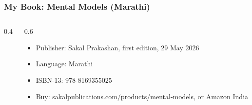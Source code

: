 
\begin{frame}[fragile]\frametitle{My Book: Mental Models (Marathi)}
\begin{columns}
    \begin{column}[T]{0.4\linewidth}
		\begin{center}
		\end{center}
    \end{column}
    \begin{column}[T]{0.6\linewidth}
		\begin{itemize}
		\item Publisher: Sakal Prakashan, first edition, 29 May 2026
		\item Language: Marathi
		\item ISBN-13: 978-8169355025
		\item Buy: sakalpublications.com/products/mental-models, or Amazon India
		\end{itemize}
		\begin{center}
		\hfill{}
		\end{center}
    \end{column}
\end{columns}
\end{frame}
